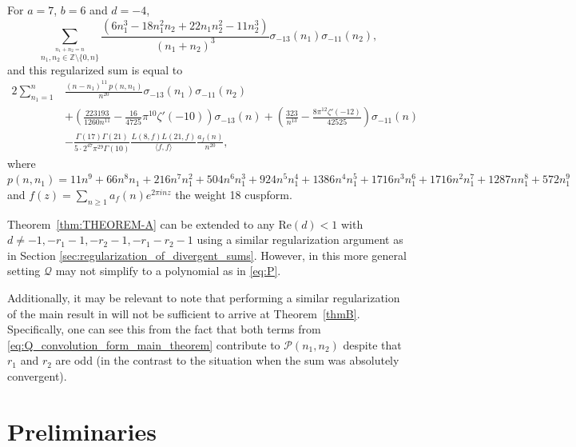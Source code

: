 \documentclass[]{article}
\begin{document}
For $a=7$, $b=6$ and $d=-4$, 
\begin{equation}\label{eq:shameless_regularization2}
    \sum_{\stackrel{n_1+n_2=n}{n_1, n_2 \in \mathbb{Z} \setminus \{ 0, n\}  } } \frac{ \left(6 n_1^3-18 n_1^2 n_2+22 n_1 n_2^2-11 n_2^3\right)}{ (n_1+n_2)^3}\sigma_{-13}(n_1) \sigma_{-11}(n_2) ,
\end{equation}
and this regularized sum is equal to
\begin{equation}
\begin{split}
   2    \sum_{ n_1 =1} ^n&\frac{  (n-n_1)^{11}\, p(n,n_1)}{n^{20}}\sigma_{-13}(n_1) \sigma_{-11 }(n_2)\\ &  +
   \left(\frac{223193  }{1260 n^{11}}-\frac{16}{4725} \pi^{10} \zeta '(-10)\right)\sigma_{-13}(n)
   + \left(\frac{323 }{n^{13}}-\frac{8 \pi^{12} \zeta '(-12)}{42525}\right)\sigma_{-11}(n)\\ & 
   -\frac{ \Gamma (17) \Gamma(21)}{5\cdot 2^{47}\pi ^{29}\Gamma \left(10\right)} \frac{L\left(8,f\right) L\left(21,f\right)}{\langle f, f \rangle }   \frac{a_f(n)}{n^{20}},
\end{split}
\end{equation}
where $p(n,n_1) = 11 n^9 + 66 n^8 n_1 + 216 n^7 n_1^2 + 504 n^6 n_1^3 + 924 n^5 n_1^4 + 
 1386 n^4 n_1^5 + 1716 n^3 n_1^6 + 1716 n^2 n_1^7 + 1287 n n_1^8 + 
 572 n_1^9$ and  $f(z)=\sum_{n\geq 1}{a_f(n)}e^{2\pi i n z}$ the weight 18 cuspform.

Theorem~\ref{thm:THEOREM-A} can be extended to any $\text{Re}(d)<1$ with $d\neq -1, -r_1-1, -r_2-1, -r_1-r_2-1$ using a similar regularization argument as in Section \ref{sec:regularization_of_divergent_sums}. However, in this more general setting $\mathcal{Q}$ may not simplify to a polynomial as in \eqref{eq:P}. 


Additionally, it may be relevant to note that performing a similar regularization of the main result in \cite{FKLR} will not be sufficient to arrive at Theorem~\ref{thmB}.
Specifically, one can see this from the fact that both terms from  \eqref{eq:Q_convolution_form_main_theorem}  contribute to $ \mathcal{P}(n_1, n_2) $ despite that $r_1$ and $r_2$ are odd (in the contrast to the situation when the sum was absolutely convergent).
  

 



\section{Preliminaries}\label{sec:prelim}
\end{document}
